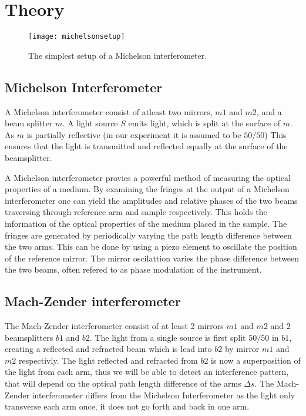\section{Theory}
\begin{figure*}
    \centering
    \texttt{[image: michelsonsetup]}
    \caption{The simplest setup of a Michelson interferometer.}
    \label{fig:configuration}
\end{figure*}
\subsection{Michelson Interferometer}
A Michelson interferometer consist of atleast two mirrors, $m1$ and $m2$, and a beam splitter $m$. A light source $S$ emits light, which is split at the surface of $m$. As $m$ is partially reflective (in our experiment it is assumed to be $50/50$) This ensures that the light is transmitted and reflected equally at the surface of the beamsplitter.

A Michelson interferometer provies a powerful method of measuring the optical properties of a medium. By examining the fringes at the output of a Michelson interferometer one can yield the amplitudes and relative phases of the two beams traversing through reference arm and sample respectively. This holds the information of the optical properties of the medium placed in the sample. The fringes are generated by periodically varying the path length difference between the two arms. This can be done by using a piezo element to oscillate the position of the reference mirror. The mirror oscilattion varies the phase difference between the two beams, often refered to as phase modulation of the instrument.

\subsection{Mach-Zender interferometer}

The Mach-Zender interferometer consist of at least 2 mirrors $m1$ and $m2$ and 2 beamsplitters $b1$ and $b2$. The light from a single source is first split $50/50$ in $b1$, creating a reflected and refracted beam which is lead into $b2$ by mirror $m1$ and $m2$ respectivly. The light reflected and refracted from $b2$ is now a superposition of the light from each arm, thus we will be able to detect an interference pattern, that will depend on the optical path length difference of the arms $\Delta s$. The Mach-Zender interferometer differs from the Michelson Interferometer as the light only transverse each arm once, it does not go forth and back in one arm. 


